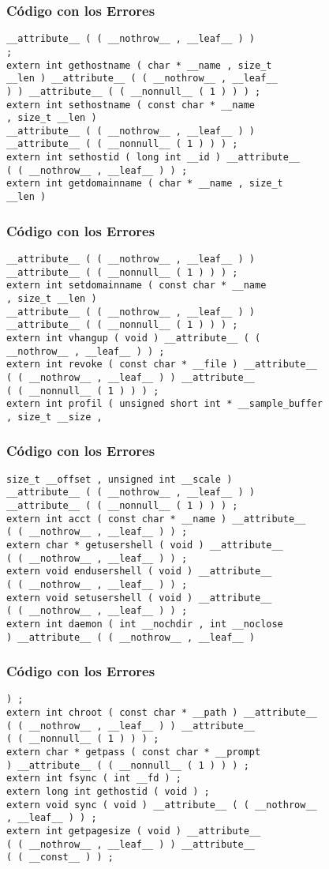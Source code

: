 \documentclass{beamer}
\begin{document}
\begin{frame}[fragile]
\frametitle{C\'odigo con los Errores}
\begin{verbatim}
__attribute__ ( ( __nothrow__ , __leaf__ ) ) 
; 
extern int gethostname ( char * __name , size_t 
__len ) __attribute__ ( ( __nothrow__ , __leaf__ 
) ) __attribute__ ( ( __nonnull__ ( 1 ) ) ) ; 
extern int sethostname ( const char * __name 
, size_t __len ) 
__attribute__ ( ( __nothrow__ , __leaf__ ) ) 
__attribute__ ( ( __nonnull__ ( 1 ) ) ) ; 
extern int sethostid ( long int __id ) __attribute__ 
( ( __nothrow__ , __leaf__ ) ) ; 
extern int getdomainname ( char * __name , size_t 
__len ) 
\end{verbatim}
\end{frame}
\begin{frame}[fragile]
\frametitle{C\'odigo con los Errores}
\begin{verbatim}
__attribute__ ( ( __nothrow__ , __leaf__ ) ) 
__attribute__ ( ( __nonnull__ ( 1 ) ) ) ; 
extern int setdomainname ( const char * __name 
, size_t __len ) 
__attribute__ ( ( __nothrow__ , __leaf__ ) ) 
__attribute__ ( ( __nonnull__ ( 1 ) ) ) ; 
extern int vhangup ( void ) __attribute__ ( ( 
__nothrow__ , __leaf__ ) ) ; 
extern int revoke ( const char * __file ) __attribute__ 
( ( __nothrow__ , __leaf__ ) ) __attribute__ 
( ( __nonnull__ ( 1 ) ) ) ; 
extern int profil ( unsigned short int * __sample_buffer 
, size_t __size , 
\end{verbatim}
\end{frame}
\begin{frame}[fragile]
\frametitle{C\'odigo con los Errores}
\begin{verbatim}
size_t __offset , unsigned int __scale ) 
__attribute__ ( ( __nothrow__ , __leaf__ ) ) 
__attribute__ ( ( __nonnull__ ( 1 ) ) ) ; 
extern int acct ( const char * __name ) __attribute__ 
( ( __nothrow__ , __leaf__ ) ) ; 
extern char * getusershell ( void ) __attribute__ 
( ( __nothrow__ , __leaf__ ) ) ; 
extern void endusershell ( void ) __attribute__ 
( ( __nothrow__ , __leaf__ ) ) ; 
extern void setusershell ( void ) __attribute__ 
( ( __nothrow__ , __leaf__ ) ) ; 
extern int daemon ( int __nochdir , int __noclose 
) __attribute__ ( ( __nothrow__ , __leaf__ ) 
\end{verbatim}
\end{frame}
\begin{frame}[fragile]
\frametitle{C\'odigo con los Errores}
\begin{verbatim}
) ; 
extern int chroot ( const char * __path ) __attribute__ 
( ( __nothrow__ , __leaf__ ) ) __attribute__ 
( ( __nonnull__ ( 1 ) ) ) ; 
extern char * getpass ( const char * __prompt 
) __attribute__ ( ( __nonnull__ ( 1 ) ) ) ; 
extern int fsync ( int __fd ) ; 
extern long int gethostid ( void ) ; 
extern void sync ( void ) __attribute__ ( ( __nothrow__ 
, __leaf__ ) ) ; 
extern int getpagesize ( void ) __attribute__ 
( ( __nothrow__ , __leaf__ ) ) __attribute__ 
( ( __const__ ) ) ; 
\end{verbatim}
\end{frame}
\end{document}
